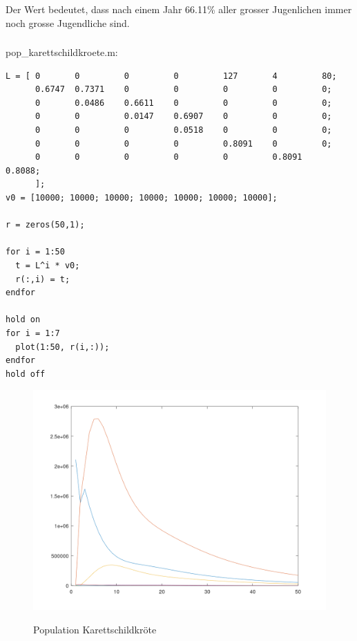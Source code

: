 \documentclass{article}
\begin{document}
\subsubsection{}
Der Wert bedeutet, dass nach einem Jahr 66.11\% aller grosser Jugenlichen immer noch grosse Jugendliche sind.

\subsubsection{}

pop\_karettschildkroete.m:

\footnotesize {
\begin{lstlisting}
L = [ 0       0         0         0         127       4         80;
      0.6747  0.7371    0         0         0         0         0;
      0       0.0486    0.6611    0         0         0         0;
      0       0         0.0147    0.6907    0         0         0;
      0       0         0         0.0518    0         0         0;
      0       0         0         0         0.8091    0         0;
      0       0         0         0         0         0.8091    0.8088;
      ];
v0 = [10000; 10000; 10000; 10000; 10000; 10000; 10000];

r = zeros(50,1);

for i = 1:50
  t = L^i * v0;
  r(:,i) = t;
endfor

hold on
for i = 1:7
  plot(1:50, r(i,:));
endfor
hold off
\end{lstlisting}
}

\begin{figure}[H]
\centering
\includegraphics[scale=0.3]{plotK1c.png}
\label{fig:universe}
\caption{Population Karettschildkröte}
\end{figure}
\end{document}
